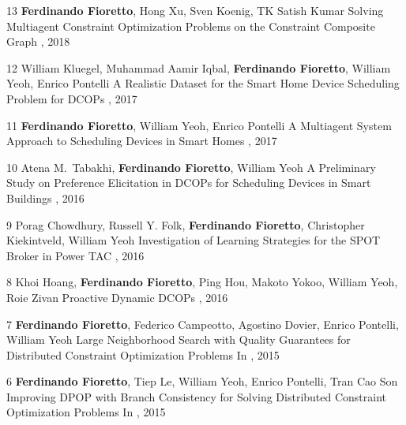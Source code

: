 \begin{pubs}
\wsentry
	{13} %
	{{\bf Ferdinando Fioretto}, Hong Xu, Sven Koenig, TK Satish Kumar}
	{Solving Multiagent Constraint Optimization Problems on the Constraint Composite Graph} 
	{, 2018}
	{~}

\wsentry
	{12} %
	{William Kluegel, Muhammad Aamir Iqbal, {\bf Ferdinando Fioretto}, William Yeoh, Enrico Pontelli}
	{A Realistic Dataset for the Smart Home Device Scheduling Problem for DCOPs}
	{, 
	2017}
	{~}	

\wsentry
	{11} %
	{{\bf Ferdinando Fioretto},  William Yeoh, Enrico Pontelli}
	{A Multiagent System Approach to Scheduling Devices in Smart Homes}
	{, 2017}
	{~}

	\wsentry
	{10} %
	{Atena M.~Tabakhi, {\bf Ferdinando Fioretto}, William Yeoh}
	{A Preliminary Study on Preference Elicitation in DCOPs for Scheduling Devices in Smart Buildings}
	{, 2016}
	{~}

\wsentry 
	{9} %
	{Porag Chowdhury, Russell Y. Folk, {\bf Ferdinando Fioretto}, Christopher Kiekintveld, William Yeoh}
	{Investigation of Learning Strategies for the SPOT Broker in Power TAC}
  	{, 2016}
	{~}

\wsentry 
	{8} %
	{Khoi Hoang, {\bf Ferdinando Fioretto}, Ping Hou, Makoto Yokoo, William Yeoh, Roie Zivan}
	{Proactive Dynamic DCOPs} 
	{, 2016}
	{~}	

\wsentry
	{7} %
	{{\bf Ferdinando Fioretto}, Federico Campeotto, Agostino Dovier, Enrico Pontelli, William Yeoh}
	{Large Neighborhood Search with Quality Guarantees for Distributed Constraint Optimization Problems} 
	{In , 2015}
	{~}

\wsentry 
	{6} %
	{{\bf Ferdinando Fioretto}, Tiep Le, William Yeoh, Enrico Pontelli, Tran Cao Son}
	{Improving DPOP with Branch Consistency for Solving Distributed Constraint Optimization Problems}
	{In , 2015}
	{~}


\end{pubs}
